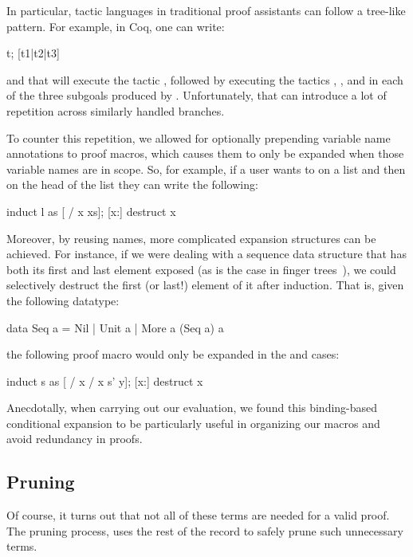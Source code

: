 In particular, tactic languages in traditional proof assistants can
follow a tree-like pattern. For example, in Coq, one can write:
\begin{code}
  t; [t1|t2|t3]
\end{code}
and that will execute the tactic , followed by executing the
tactics , , and  in each of the three subgoals
produced by . Unfortunately, that can introduce a lot of
repetition across similarly handled branches.

To counter this repetition, we allowed for optionally prepending
variable name annotations to proof macros, which causes them to only
be expanded when those variable names are in scope. So, for example,
if a user wants to  on a list  and then
 on the head of the list they can write the following:
\begin{code}
  induct l as [ / x xs];
  [x:] destruct x
\end{code}
%
Moreover, by reusing names, more complicated expansion structures can
be achieved. For instance, if we were dealing with a sequence data
structure that has both its first and last element exposed (as is the
case in finger trees~\cite{FingerTrees}), we could selectively destruct
the first (or last!) element of it after induction. That is, given the
following  datatype:
%
\begin{code}
  data Seq a = Nil | Unit a | More a (Seq a) a
\end{code}
%
the following proof macro would only be expanded in the  and
 cases:
\begin{code}
  induct s as [ / x / x s' y];
  [x:] destruct x
\end{code}
%
Anecdotally, when carrying out our evaluation, we found this
binding-based conditional expansion to be particularly useful in
organizing our macros and avoid redundancy in proofs.

\subsection{Pruning}


Of course, it turns out that not all of these terms are needed for a
valid proof. The pruning process, uses the rest of the 
record to safely prune such unnecessary terms.

